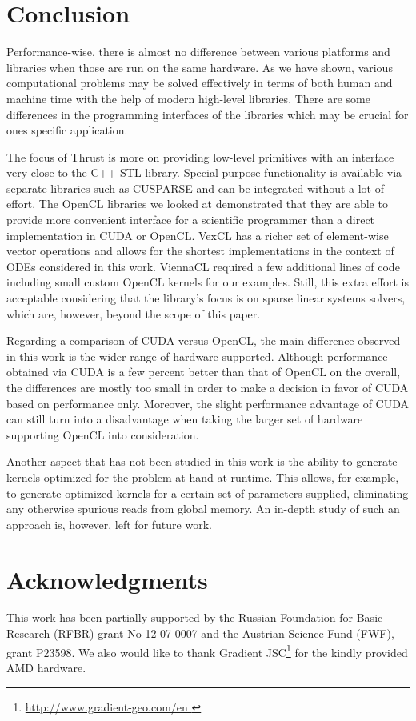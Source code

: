 \documentclass[final]{siamltex}
\begin{document}
%
%
\section{Conclusion}

Performance-wise, there is almost no difference between various platforms and
libraries when those are run on the same hardware. As we have shown, various
computational problems may be solved effectively in terms of both human and
machine time with the help of modern high-level libraries.  There are some
differences in the programming interfaces of the libraries which may be crucial
for ones specific application.

The focus of Thrust is more on providing low-level primitives with an interface
very close to the C++ STL library.
Special purpose functionality is available via separate libraries such as CUSPARSE
and can be integrated without a lot of effort.
The OpenCL libraries we looked at demonstrated that they are able to
provide more convenient interface for a scientific programmer than a direct
implementation in CUDA or OpenCL.
VexCL has a richer set of element-wise vector operations and allows for the
shortest implementations in the context of ODEs considered in this work.
ViennaCL required a few additional lines of code including small custom OpenCL kernels for our examples.
Still, this extra effort is acceptable considering that the library's focus is on sparse linear systems solvers,
which are, however, beyond the scope of this paper.

Regarding a comparison of CUDA versus OpenCL, the main difference observed in this work is the wider range of hardware supported.
Although performance obtained via CUDA is a few percent better than that of OpenCL on the overall,
the differences are mostly too small in order to make a decision in favor of CUDA based on performance only.
Moreover, the slight performance advantage of CUDA can still turn into a disadvantage when taking the larger set of hardware supporting OpenCL into consideration.


Another aspect that has not been studied in this work is the ability to generate kernels
optimized for the problem at hand at runtime. This allows, for example, to generate
optimized kernels for a certain set of parameters supplied, eliminating any otherwise spurious reads from global memory.
An in-depth study of such an approach is, however, left for future work.

\section{Acknowledgments}

This work has been partially supported by the Russian Foundation for Basic
Research (RFBR) grant No 12-07-0007 and the Austrian Science Fund (FWF), grant P23598.
We also would like to thank Gradient JSC\footnote{ \href{
http://www.gradient-geo.com/en }{ http://www.gradient-geo.com/en } } for the
kindly provided AMD hardware.




\end{document}
